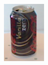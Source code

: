 \begin{figure}
\begin{subfigure}[b]{0.3\textwidth}
		\includegraphics[width=\textwidth]{img/obj_nuevos/soda_can.png}
	\end{subfigure}
	\quad
	\begin{subfigure}[b]{0.3\textwidth}

\end{subfigure}
\end{figure}
